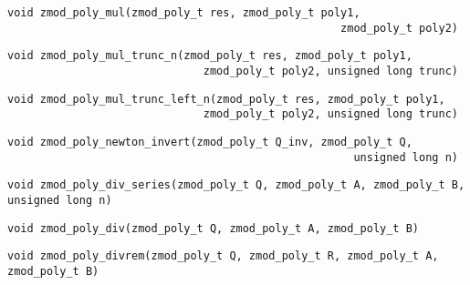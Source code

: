 \documentclass[a4paper,10pt]{article}
\begin{document}
\begin{lstlisting}
void zmod_poly_mul(zmod_poly_t res, zmod_poly_t poly1, 
                                                   zmod_poly_t poly2)
\end{lstlisting}
\begin{quote}
\end{quote}

\begin{lstlisting}
void zmod_poly_mul_trunc_n(zmod_poly_t res, zmod_poly_t poly1, 
                              zmod_poly_t poly2, unsigned long trunc)
\end{lstlisting}
\begin{quote}
\end{quote}

\begin{lstlisting}
void zmod_poly_mul_trunc_left_n(zmod_poly_t res, zmod_poly_t poly1, 
                              zmod_poly_t poly2, unsigned long trunc)
\end{lstlisting}
\begin{quote}
\end{quote}

\begin{lstlisting}
void zmod_poly_newton_invert(zmod_poly_t Q_inv, zmod_poly_t Q, 
                                                     unsigned long n)
\end{lstlisting}
\begin{quote}
\end{quote}

\begin{lstlisting}
void zmod_poly_div_series(zmod_poly_t Q, zmod_poly_t A, zmod_poly_t B, unsigned long n)
\end{lstlisting}
\begin{quote}
\end{quote}

\begin{lstlisting}
void zmod_poly_div(zmod_poly_t Q, zmod_poly_t A, zmod_poly_t B)
\end{lstlisting}
\begin{quote}
\end{quote}

\begin{lstlisting}
void zmod_poly_divrem(zmod_poly_t Q, zmod_poly_t R, zmod_poly_t A, zmod_poly_t B)
\end{lstlisting}
\begin{quote}
\end{quote}
\end{document}
